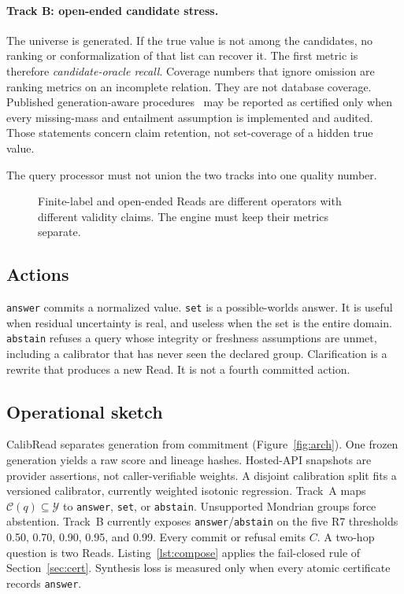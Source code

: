 \documentclass[sigconf, nonacm]{acmart}
\newcommand{\cbraa}{\texttt{answer}/\allowbreak\texttt{abstain}}
\newcommand{\cbrth}{0.50, 0.70, 0.90, 0.95, and 0.99}
\begin{document}
\paragraph{Track B: open-ended candidate stress.}
The universe is generated. If the true value is not among the candidates, no ranking or conformalization of that list can recover it. The first metric is therefore \emph{candidate-oracle recall}. Coverage numbers that ignore omission are ranking metrics on an incomplete relation. They are not database coverage. Published generation-aware procedures~\cite{mohri2024language,wang2024conu} may be reported as certified only when every missing-mass and entailment assumption is implemented and audited. Those statements concern claim retention, not set-coverage of a hidden true value.

The query processor must not union the two tracks into one quality number.

\begin{figure}[t]
  \centering
  \CalibReadFigTracks
  \caption{Finite-label and open-ended Reads are different operators with different validity claims. The engine must keep their metrics separate.}
  \label{fig:tracks}
\end{figure}

\subsection{Actions}

\texttt{answer} commits a normalized value. \texttt{set} is a possible-worlds answer. It is useful when residual uncertainty is real, and useless when the set is the entire domain. \texttt{abstain} refuses a query whose integrity or freshness assumptions are unmet, including a calibrator that has never seen the declared group. Clarification is a rewrite that produces a new Read. It is not a fourth committed action.

\subsection{Operational sketch}
\label{sec:opsketch}

CalibRead separates generation from commitment (Figure~\ref{fig:arch}). One frozen generation yields a raw score and lineage hashes. Hosted-API snapshots are provider assertions, not caller-verifiable weights. A disjoint calibration split fits a versioned calibrator, currently weighted isotonic regression. Track~A maps $\mathcal{C}(q)\subseteq\mathcal{Y}$ to \texttt{answer}, \texttt{set}, or \texttt{abstain}. Unsupported Mondrian groups force abstention. Track~B currently exposes \cbraa{} on the five R7 thresholds \cbrth{}. Every commit or refusal emits $C$. A two-hop question is two Reads. Listing~\ref{lst:compose} applies the fail-closed rule of Section~\ref{sec:cert}. Synthesis loss is measured only when every atomic certificate records \texttt{answer}.
\end{document}
